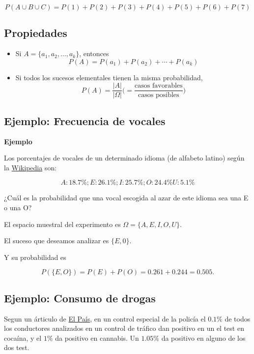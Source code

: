 \documentclass[]{book}
\begin{document}
\[P(A\cup B\cup C)=P(1)+P(2)+P(3)+P(4)+P(5)+P(6)+P(7)\]

\hypertarget{propiedades-11}{%
\subsection{Propiedades}\label{propiedades-11}}

\begin{itemize}
\item
  Si \(A=\{a_1,a_2,\ldots,a_k\}\), entonces
  \[
  P(A)=P(a_1)+P(a_2)+\cdots+P(a_k)
  \]
\item
  Si todos los sucesos elementales tienen la misma probabilidad,
  \[
  P(A)=\frac{|A|}{|\Omega|}\Big(=\frac{\mbox{casos favorables}}{\mbox{casos posibles}}\Big)
  \]
\end{itemize}

\hypertarget{ejemplo-frecuencia-de-vocales}{%
\subsection{Ejemplo: Frecuencia de vocales}\label{ejemplo-frecuencia-de-vocales}}

\textbf{Ejemplo}

Los porcentajes de vocales de un determinado idioma (de alfabeto latino) según la \href{https://es.wikipedia.org/wiki/Frecuencia_de_aparici\%C3\%B3n_de_letras}{Wikipedia} son:

\[A: 18.7\%; E: 26.1\%; I: 25.7\%; O: 24.4\% U: 5.1\%\]

¿Cuál es la probabilidad que una vocal escogida al azar de este idioma sea una E o una O?

El espacio muestral del experimento es \(\Omega=\{A,E,I,O,U\}\).

El suceso que deseamos analizar es \(\{E,0\}\).

Y su probabilidad es

\[P(\{E,O\})=P(E)+P(O)=0.261+0.244=0.505.\]

\hypertarget{ejemplo-consumo-de-drogas}{%
\subsection{Ejemplo: Consumo de drogas}\label{ejemplo-consumo-de-drogas}}

Segun un árticulo de \href{https://elpais.com/politica/2019/01/02/actualidad/1546426491_623324.html}{El País}, en un control especial de la policía el \(0.1\%\) de todos los conductores analizados en un control de tráfico dan positivo en un el test en cocaína, y el \(1\%\) da positivo en cannabis. Un \(1.05\%\) da positivo en alguno de los dos test.
\end{document}
